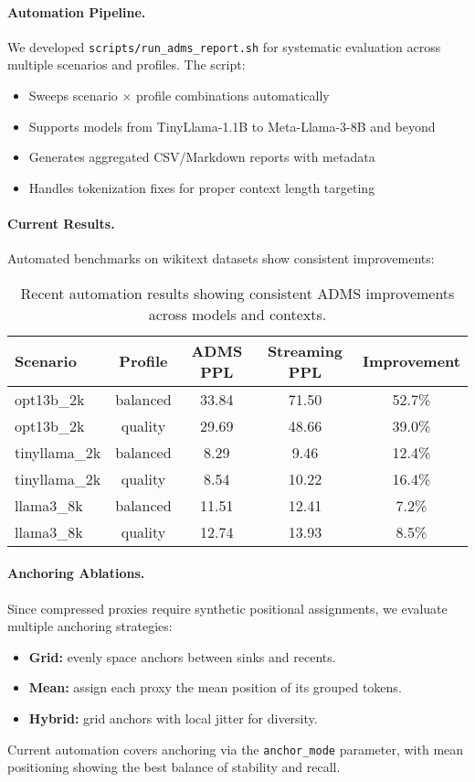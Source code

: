 \documentclass[11pt]{article}
\begin{document}
\paragraph{Automation Pipeline.}
We developed \texttt{scripts/run\_adms\_report.sh} for systematic evaluation across multiple scenarios and profiles. The script:
\begin{itemize}
  \item Sweeps scenario $\times$ profile combinations automatically
  \item Supports models from TinyLlama-1.1B to Meta-Llama-3-8B and beyond
  \item Generates aggregated CSV/Markdown reports with metadata
  \item Handles tokenization fixes for proper context length targeting
\end{itemize}

\paragraph{Current Results.}
Automated benchmarks on wikitext datasets show consistent improvements:

\begin{table}[h]
\centering
\begin{tabular}{lcccc}
\toprule
\textbf{Scenario} & \textbf{Profile} & \textbf{ADMS PPL} & \textbf{Streaming PPL} & \textbf{Improvement} \\
\midrule
opt13b\_2k & balanced & 33.84 & 71.50 & 52.7\% \\
opt13b\_2k & quality & 29.69 & 48.66 & 39.0\% \\
tinyllama\_2k & balanced & 8.29 & 9.46 & 12.4\% \\
tinyllama\_2k & quality & 8.54 & 10.22 & 16.4\% \\
llama3\_8k & balanced & 11.51 & 12.41 & 7.2\% \\
llama3\_8k & quality & 12.74 & 13.93 & 8.5\% \\
\bottomrule
\end{tabular}
\caption{Recent automation results showing consistent ADMS improvements across models and contexts.}
\end{table}

\paragraph{Anchoring Ablations.}
Since compressed proxies require synthetic positional assignments, we evaluate multiple anchoring strategies:
\begin{itemize}
  \item \textbf{Grid:} evenly space anchors between sinks and recents.
  \item \textbf{Mean:} assign each proxy the mean position of its grouped tokens.
  \item \textbf{Hybrid:} grid anchors with local jitter for diversity.
\end{itemize}
Current automation covers anchoring via the \texttt{anchor\_mode} parameter, with mean positioning showing the best balance of stability and recall.
\end{document}
